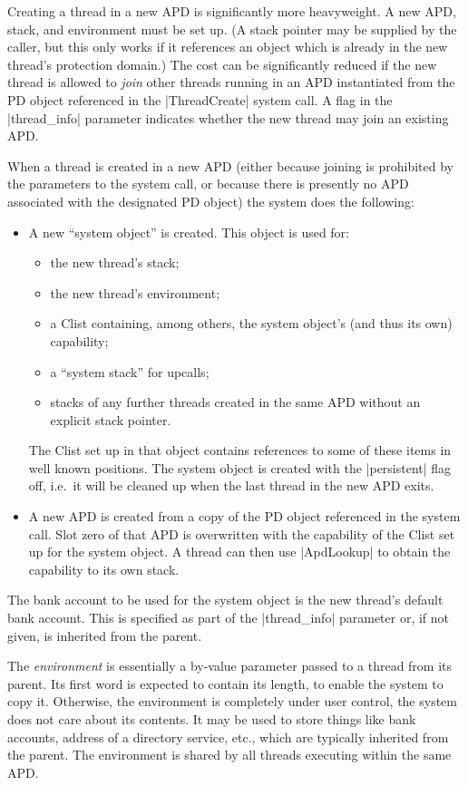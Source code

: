 \documentclass[a4paper,11pt,twoside,dvips]{report}
\begin{document}
Creating a thread in a new APD is significantly more heavyweight. A new
APD, stack, and environment must be set up. (A stack pointer may be
supplied by the caller, but this only works if it references an object
which is already in the new thread's protection domain.)  The cost can be
significantly reduced if the new thread is allowed to \emph{join} other
threads running in an APD instantiated from the PD object referenced in
the |ThreadCreate| system call. A flag in the |thread\_info| parameter
indicates whether the new thread may join an existing APD.

When a thread is created in a new APD (either because joining is
prohibited by the parameters to the system call, or because there is
presently no APD associated with the designated PD object) the system
does the following:

\begin{itemize}
\item A new ``system object'' is created. This object is used for:
\begin{itemize}
\item the new thread's stack;
\item the new thread's environment;
\item a Clist containing, among others, the system object's (and thus
its own) capability;
\item a ``system stack'' for upcalls;
\item stacks of any further threads created in the same APD without an
explicit stack pointer.
\end{itemize}
The Clist set up in that object contains references to some of these
items in well known positions. The system object is created with the
|persistent| flag off, i.e.\ it will be cleaned up when the last thread
in the new APD exits.
\item A new APD is created from a copy of the PD object referenced in
the system call. Slot zero of that APD is overwritten with the
capability of the Clist set up for the system object. A thread can then
use |ApdLookup| to obtain the capability to its own stack.
\end{itemize}

The bank account to be used for the system object is the new thread's
default bank account. This is specified as part of the |thread\_info|
parameter or, if not given, is inherited from the parent.

The \emph{environment} is essentially a by-value parameter passed to a
thread from its parent. Its first word is expected to contain its
length, to enable the system to copy it.  Otherwise, the environment is
completely under user control, the system does not care about its
contents. It may be used to store things like bank accounts, address of
a directory service, etc., which are typically inherited from the
parent. The environment is shared by all threads executing within the
same APD.
\end{document}
